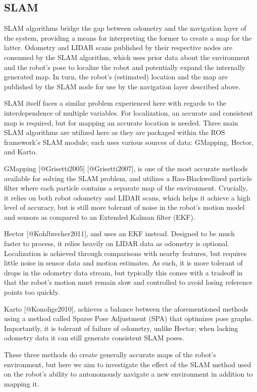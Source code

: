 \documentclass{article}
\begin{document}
\subsection{SLAM}
SLAM algorithms bridge the gap between odometry and the navigation layer of the system, providing a means for interpreting the former to create a map for the latter. Odometry and LIDAR scans published by their respective nodes are consumed by the SLAM algorithm, which uses prior data about the environment and the robot's pose to localize the robot and potentially expand the internally generated map. In turn, the robot's (estimated) location and the map are published by the SLAM node for use by the navigation layer described above.

SLAM itself faces a similar problem experienced here with regards to the interdependence of multiple variables. For localization, an accurate and consistent map is required, but for mapping an accurate location is needed. Three main SLAM algorithms are utilized here as they are packaged within the ROS framework's SLAM module; each uses various sources of data: GMapping, Hector, and Karto. 

GMapping [@Grisetti2005] [@Grisetti2007], is one of the most accurate methods available for solving the SLAM problem, and utilizes a Rao-Blackwellized particle filter where each particle contains a separate map of the environment. Crucially, it relies on both robot odometry and LIDAR scans, which helps it achieve a high level of accuracy, but is still more tolerant of noise in the robot's motion model and sensors as compared to an Extended Kalman filter (EKF).

Hector [@Kohlbrecher2011], and uses an EKF instead. Designed to be much faster to process, it relies heavily on LIDAR data as odometry is optional. Localization is achieved through comparisons with nearby features, but requires little noise in sensor data and motion estimates. As such, it is more tolerant of drops in the odometry data stream, but typically this comes with a tradeoff in that the robot's motion must remain slow and controlled to avoid losing reference points too quickly.

Karto [@Konolige2010], achieves a balance between the aforementioned methods using a method called Sparse Pose Adjustment (SPA) that optimizes pose graphs. Importantly, it is tolerant of failure of odometry, unlike Hector; when lacking odometry data it can still generate consistent SLAM poses.

These three methods do create generally accurate maps of the robot's environment, but here we aim to investigate the effect of the SLAM method used on the robot's ability to autonomously navigate a new environment in addition to mapping it.
\end{document}
